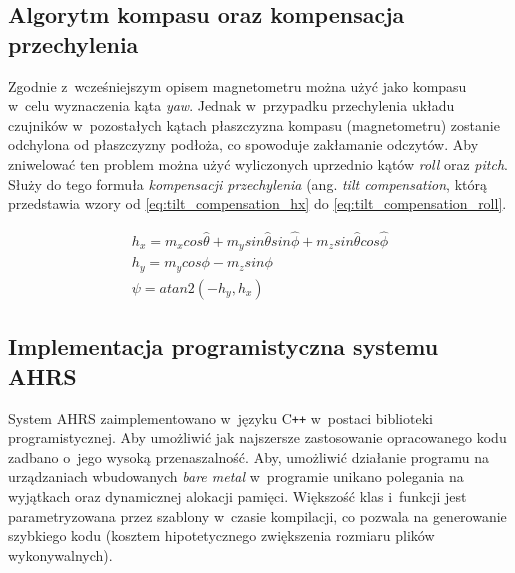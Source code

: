 \subsection{Algorytm kompasu oraz kompensacja przechylenia}

Zgodnie z~wcześniejszym opisem magnetometru można użyć jako kompasu w~celu
wyznaczenia kąta \textit{yaw}.
Jednak w~przypadku przechylenia układu czujników w~pozostałych kątach
płaszczyzna kompasu (magnetometru) zostanie odchylona od płaszczyzny podłoża,
co spowoduje zakłamanie odczytów.
Aby zniwelować ten problem można użyć wyliczonych uprzednio kątów \textit{roll}
oraz \textit{pitch}.
Służy do tego formuła \textit{kompensacji przechylenia} (ang. \textit{tilt
compensation}, którą przedstawia wzory od \ref{eq:tilt_compensation_hx} do
\ref{eq:tilt_compensation_roll}.

\begin{gather}
	h_x = m_x cos\hat{\theta} + 
	      m_y sin\hat{\theta} sin\hat{\phi} +
          m_z sin\hat{\theta} cos\hat{\phi}
\label{eq:tilt_compensation_hx} \\
    h_y = m_y cos\phi - m_z sin\phi
\label{eq:tilt_compensation_hy} \\
    \psi = atan2(-h_y, h_x)
\label{eq:tilt_compensation_roll}
\end{gather}

\subsection{Implementacja programistyczna systemu AHRS}
System AHRS zaimplementowano w~języku C\texttt{++} w~postaci biblioteki
programistycznej.
Aby umożliwić jak najszersze zastosowanie opracowanego kodu zadbano o~jego
wysoką przenaszalność.
Aby, umożliwić działanie programu na urządzaniach wbudowanych \textit{bare
metal} w~programie unikano polegania na wyjątkach oraz dynamicznej alokacji
pamięci.
Większość klas i~funkcji jest parametryzowana przez szablony w~czasie
kompilacji, co pozwala na generowanie szybkiego kodu (kosztem
hipotetycznego zwiększenia rozmiaru plików wykonywalnych).